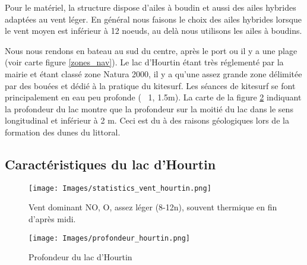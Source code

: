 \documentclass[12pt,a4paper]{report}
\begin{document}
Pour le matériel, la structure dispose d'ailes à boudin et aussi des ailes 
hybrides adaptées au vent léger. En général nous faisons le choix des ailes hybrides 
lorsque le vent moyen est inférieur à 12 noeuds, au delà nous utilisons
les ailes à boudins.

Nous nous rendons en bateau au sud du centre, après le port ou il y a 
une plage (voir carte figure \ref{zones_nav}). Le lac d'Hourtin étant très 
réglementé par la mairie et étant classé zone Natura 2000\cite{natura2000}, 
il y a qu'une assez grande zone délimitée par des bouées et dédié à la pratique
du kitesurf.
Les séances de kitesurf se font principalement en eau peu profonde (~ 1, 1.5m).
La carte de la figure \ref{carte_profondeur} indiquant la profondeur du lac montre que la 
profondeur sur la moitié du lac dans le sens longitudinal 
et inférieur à 2 m. Ceci est du à des raisons géologiques lors de la
formation des dunes du littoral.

\subsection{Caractéristiques du lac d'Hourtin}
\begin{figure}
\texttt{[image: Images/statistics\_vent\_hourtin.png]} 
\caption{Vent dominant NO, O, assez léger (8-12n), 
souvent thermique en fin d'après midi.\label{vent_stats}}

\end{figure}

\begin{figure}
\texttt{[image: Images/profondeur\_hourtin.png]} 
\caption{Profondeur du lac d'Hourtin\label{carte_profondeur}}
\end{figure}
\end{document}
